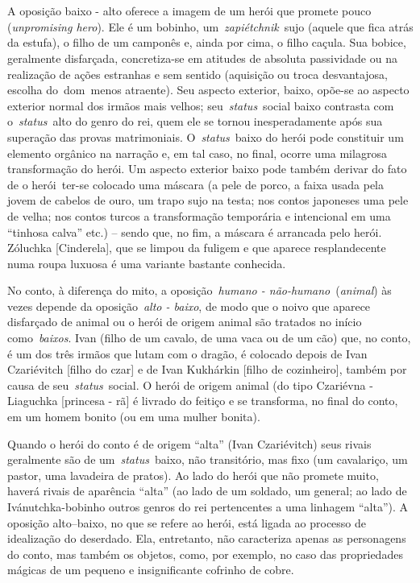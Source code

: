 ~

~

A oposição baixo - alto oferece a imagem de um herói que promete pouco
(\emph{\emph{unpromising hero}}). Ele é um bobinho,
um~\emph{zapiétchnik}~sujo (aquele que fica atrás da estufa), o filho de
um camponês e, ainda por cima, o filho caçula. Sua bobice, geralmente
disfarçada, concretiza-se em atitudes de absoluta passividade ou na
realização de ações estranhas e sem sentido (aquisição ou troca
desvantajosa, escolha do~dom~menos atraente). Seu aspecto exterior,
baixo, opõe-se ao aspecto exterior normal dos irmãos mais velhos;
seu~\emph{status}~social baixo contrasta com o~\emph{status}~alto do
genro do rei, quem ele se tornou inesperadamente após sua superação das
provas matrimoniais. O~\emph{status}~baixo do herói pode constituir um
elemento orgânico na narração e, em tal caso, no final, ocorre uma
milagrosa transformação do herói. Um aspecto exterior baixo pode também
derivar do fato de o herói~ter-se colocado uma máscara (a pele de porco,
a faixa usada pela jovem de cabelos de ouro, um trapo sujo na testa; nos
contos japoneses uma pele de velha; nos contos turcos a transformação
temporária e intencional em uma ``tinhosa calva'' etc.) -- sendo que, no
fim, a máscara é arrancada pelo herói. Zóluchka {[}Cinderela{]}, que se
limpou da fuligem e que aparece resplandecente numa roupa luxuosa é uma
variante bastante conhecida.

No conto, à diferença do mito, a oposição~\emph{humano -
não-humano}~(\emph{animal}) às vezes depende da oposição~\emph{alto -
baixo}, de modo que o noivo que aparece disfarçado de animal ou o herói
de origem animal são tratados no início como~\emph{baixos}. Ivan (filho
de um cavalo, de uma vaca ou de um cão) que, no conto, é um dos três
irmãos que lutam com o dragão, é colocado depois de Ivan Czariévitch
{[}filho do czar{]} e de Ivan Kukhárkin {[}filho de cozinheiro{]},
também por causa de seu~\emph{status}~social. O herói de origem animal
(do tipo Czariévna - Liaguchka {[}princesa - rã{]} é livrado do feitiço
e se transforma, no final do conto, em um homem bonito (ou em uma mulher
bonita).

Quando o herói do conto é de origem ``alta'' (Ivan Czariévitch) seus
rivais geralmente são de um~\emph{status}~baixo, não transitório, mas
fixo (um cavalariço, um pastor, uma lavadeira de pratos). Ao lado do
herói que não promete muito, haverá rivais de aparência ``alta'' (ao
lado de um soldado, um general; ao lado de Ivánutchka-bobinho outros
genros do rei pertencentes a uma linhagem ``alta''). A oposição
alto--baixo, no que se refere ao herói, está ligada ao processo de
idealização do deserdado. Ela, entretanto, não caracteriza apenas as
personagens do conto, mas também os objetos, como, por exemplo, no caso
das propriedades mágicas de um pequeno e insignificante cofrinho de
cobre.

